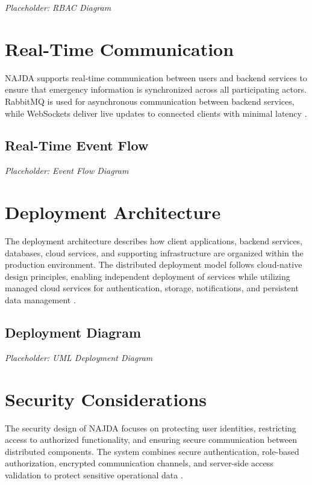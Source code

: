 \textit{Placeholder: RBAC Diagram}


\section{Real-Time Communication}

NAJDA supports real-time communication between users and backend services to ensure that emergency information is synchronized across all participating actors. RabbitMQ is used for asynchronous communication between backend services, while WebSockets deliver live updates to connected clients with minimal latency \cite{rabbitmq,websocket}.

\subsection{Real-Time Event Flow}

\textit{Placeholder: Event Flow Diagram}


\section{Deployment Architecture}

The deployment architecture describes how client applications, backend services, databases, cloud services, and supporting infrastructure are organized within the production environment. The distributed deployment model follows cloud-native design principles, enabling independent deployment of services while utilizing managed cloud services for authentication, storage, notifications, and persistent data management \cite{firebase,postgresql}.

\subsection{Deployment Diagram}

\textit{Placeholder: UML Deployment Diagram}


\section{Security Considerations}

The security design of NAJDA focuses on protecting user identities, restricting access to authorized functionality, and ensuring secure communication between distributed components. The system combines secure authentication, role-based authorization, encrypted communication channels, and server-side access validation to protect sensitive operational data \cite{pressman2020se,firebase}.

